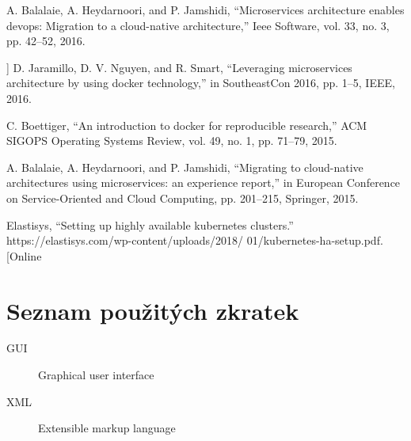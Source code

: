 \documentclass[thesis=M,czech]{FITthesis}[2019/12/23]
\theoremstyle{plain}
\theoremstyle{definition}
\begin{document}
\begin{thebibliography}{9}

	A. Balalaie, A. Heydarnoori, and P. Jamshidi, “Microservices architecture enables devops: Migration to a cloud-native architecture,” Ieee Software, vol. 33, no. 3, pp. 42–52, 2016.



	] D. Jaramillo, D. V. Nguyen, and R. Smart, “Leveraging microservices architecture by using docker technology,” in SoutheastCon 2016, pp. 1–5, IEEE,
	2016.


	C. Boettiger, “An introduction to docker for reproducible research,” ACM
	SIGOPS Operating Systems Review, vol. 49, no. 1, pp. 71–79, 2015.


		A. Balalaie, A. Heydarnoori, and P. Jamshidi, “Migrating to cloud-native
	architectures using microservices: an experience report,” in European Conference on Service-Oriented and Cloud Computing, pp. 201–215, Springer,
	2015.


	Elastisys, “Setting up highly available kubernetes clusters.”
	https://elastisys.com/wp-content/uploads/2018/
	01/kubernetes-ha-setup.pdf. [Online
\end{thebibliography}



\appendix

\chapter{Seznam použitých zkratek}
\begin{description}
	\item[GUI] Graphical user interface
	\item[XML] Extensible markup language
\end{description}
\end{document}
